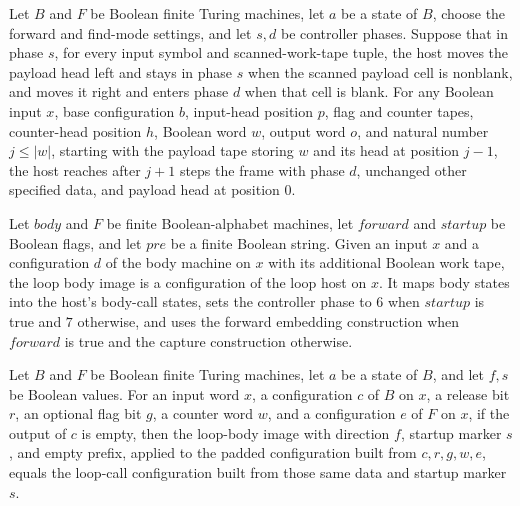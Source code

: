\begin{lemma}
\label{Turing.FinTM.loopHost_payload_scan}
\leanok
{}
Let $B$ and $F$ be Boolean finite Turing machines, let $a$ be a state of $B$, choose the
forward and find-mode settings, and let $s,d$ be controller phases. Suppose that in
phase $s$, for every input symbol and scanned-work-tape tuple, the host moves the
payload head left and stays in phase $s$ when the scanned payload cell is nonblank, and
moves it right and enters phase $d$ when that cell is blank. For any Boolean input $x$,
base configuration $b$, input-head position $p$, flag and counter tapes, counter-head
position $h$, Boolean word $w$, output word $o$, and natural number $j\le |w|$, starting
with the payload tape storing $w$ and its head at position $j-1$, the host reaches after
$j+1$ steps the frame with phase $d$, unchanged other specified data, and payload head
at position $0$.
\end{lemma}

\begin{definition}
\label{Turing.FinTM.loopBodyImage}
\leanok
{}
Let $body$ and $F$ be finite Boolean-alphabet machines, let $forward$ and $startup$ be
Boolean flags, and let $pre$ be a finite Boolean string. Given an input $x$ and a
configuration $d$ of the body machine on $x$ with its additional Boolean work tape, the
loop body image is a configuration of the loop host on $x$. It maps body states into the
host's body-call states, sets the controller phase to $6$ when $startup$ is true and $7$
otherwise, and uses the forward embedding construction when $forward$ is true and the
capture construction otherwise.
\end{definition}

\begin{lemma}
\label{Turing.FinTM.loopBodyImage_nil}
\leanok
{}
Let $B$ and $F$ be Boolean finite Turing machines, let $a$ be a state of $B$, and let
$f,s$ be Boolean values. For an input word $x$, a configuration $c$ of $B$ on $x$, a
release bit $r$, an optional flag bit $g$, a counter word $w$, and a configuration $e$
of $F$ on $x$, if the output of $c$ is empty, then the loop-body image with direction
$f$, startup marker $s$, and empty prefix, applied to the padded configuration built
from $c,r,g,w,e$, equals the loop-call configuration built from those same data and
startup marker $s$.
\end{lemma}

